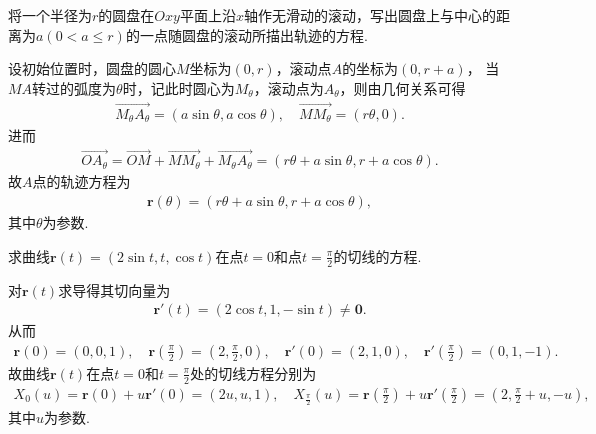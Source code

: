 \documentclass[../../main.tex]{subfiles}%
\begin{document}
\begin{example}
将一个半径为$r$的圆盘在$Oxy$平面上沿$x$轴作无滑动的滚动，写出圆盘上与中心的距离为$a(0 < a \leqslant r)$的一点随圆盘的滚动所描出轨迹的方程.
\end{example}
\begin{solution}
设初始位置时，圆盘的圆心$M$坐标为$(0,r)$，滚动点$A$的坐标为$(0,r+a)$，
当$MA$转过的弧度为$\theta$时，记此时圆心为$M_\theta$，滚动点为$A_\theta$，则由几何关系可得
\begin{align*}
\overrightarrow{M_{\theta}A_{\theta}}=(a\sin\theta,a\cos\theta),\quad \overrightarrow{MM_{\theta}}=(r\theta,0).
\end{align*}
进而
\begin{align*}
\overrightarrow{OA_{\theta}}=\overrightarrow{OM}+\overrightarrow{MM_{\theta}}+\overrightarrow{M_{\theta}A_{\theta}}=(r\theta+a\sin\theta,r+a\cos\theta).
\end{align*}
故$A$点的轨迹方程为
\begin{align*}
\boldsymbol{r}(\theta)=(r\theta+a\sin\theta,r+a\cos\theta),
\end{align*}
其中$\theta$为参数.

\end{solution}

\begin{example}
求曲线$\bm{r}(t) = (2\sin t, t, \cos t)$在点$t = 0$和点$t = \frac{\pi}{2}$的切线的方程.
\end{example}
\begin{solution}
对$\bm{r}(t)$求导得其切向量为\begin{align*}
\bm{r}'(t)=(2\cos t,1,-\sin t)\neq\bm{0}.
\end{align*}
从而\begin{align*}
\bm{r}(0)=(0,0,1),\quad \bm{r}\left(\frac{\pi}{2}\right)=\left(2,\frac{\pi}{2},0\right),\quad \bm{r}'(0)=(2,1,0),\quad \bm{r}'\left(\frac{\pi}{2}\right)=(0,1,-1).
\end{align*}
故曲线$\bm{r}(t)$在点$t=0$和$t=\frac{\pi}{2}$处的切线方程分别为\begin{align*}
X_0(u)=\bm{r}(0)+u\bm{r}'(0)=(2u,u,1),\quad X_{\frac{\pi}{2}}(u)=\bm{r}\left(\frac{\pi}{2}\right)+u\bm{r}'\left(\frac{\pi}{2}\right)=\left(2,\frac{\pi}{2}+u,-u\right),
\end{align*}
其中$u$为参数.

\end{solution}
\end{document}
